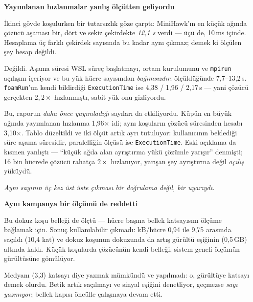 \documentclass[11pt,a4paper]{article}
\newcommand{\kkkenar}{lacivert}
\newcommand{\kkzemin}{kod}
\newenvironment{renkkutu}[3]{%
  \renewcommand{\kkkenar}{#1}\renewcommand{\kkzemin}{#2}%
  \par\medskip\noindent
  \begin{lrbox}{\kutugovde}%
  \begin{minipage}{\dimexpr\linewidth-2\fboxsep-2\fboxrule\relax}\footnotesize
  \textcolor{#1}{\textbf{#3}}\par\vspace{3pt}%
}{%
  \end{minipage}%
  \end{lrbox}%
  \noindent\fcolorbox{\kkkenar}{\kkzemin}{\usebox{\kutugovde}}%
  \par\medskip
}
\newenvironment{olculdu}[1]{\begin{renkkutu}{iyi}{iyibg}{#1}}{\end{renkkutu}}
\newenvironment{dikkat}[1]{\begin{renkkutu}{orta}{ortabg}{#1}}{\end{renkkutu}}
\begin{document}
\begin{olculdu}{Yayımlanan hızlanmalar yanlış ölçütten geliyordu}
İkinci gövde koşulurken bir tutarsızlık göze çarptı: MiniHawk'ın en küçük ağında
çözücü aşaması bir, dört ve sekiz çekirdekte \emph{12{,}1 s} verdi --- üçü de,
10\,ms içinde. Hesaplama üç farklı çekirdek sayısında bu kadar aynı çıkmaz;
demek ki ölçülen şey hesap değildi.

Değildi. Aşama süresi WSL süreç başlatmayı, ortam kurulumunu ve \texttt{mpirun}
açılışını içeriyor ve bu yük hücre sayısından \emph{bağımsızdır}: ölçüldüğünde
7{,}7--13{,}2\,s. \texttt{foamRun}'un kendi bildirdiği \texttt{ExecutionTime}
ise 4{,}38 / 1{,}96 / 2{,}17\,s --- yani çözücü gerçekten $2{,}2\times$
hızlanmıştı, sabit yük onu gizliyordu.

Bu, raporun \emph{daha önce yayımladığı} sayıları da etkiliyordu. Küpün en büyük
ağında yayımlanan hızlanma 1{,}96$\times$ idi; aynı koşuların çözücü süresinden
hesabı 3{,}10$\times$. Tablo düzeltildi ve iki ölçüt artık ayrı tutuluyor:
kullanıcının beklediği süre aşama süresidir, paralelliğin ölçüsü ise
\texttt{ExecutionTime}. Eski açıklama da kısmen yanlıştı --- ``küçük ağda alan
ayrıştırma yükü çözümle yarışır'' denmişti; 16 bin hücrede çözücü rahatça
$2\times$ hızlanıyor, yarışan şey ayrıştırma değil \emph{açılış} yüküydü.

\begin{center}\itshape
Aynı sayının üç kez üst üste çıkması bir doğrulama değil, bir uyarıydı.
\end{center}
\end{olculdu}

\begin{dikkat}{Aynı kampanya bir ölçümü de reddetti}
Bu dokuz koşu belleği de ölçtü --- hücre başına bellek katsayısını ölçüme
bağlamak için. Sonuç kullanılabilir çıkmadı: kB/hücre 0{,}94 ile 9{,}75
arasında saçıldı (10{,}4 kat) ve dokuz koşunun dokuzunda da artış gürültü
eşiğinin (0{,}5\,GB) altında kaldı. Küçük koşularda çözücünün kendi belleği,
sistem geneli ölçümün gürültüsüne gömülüyor.

Medyanı (3{,}3) katsayı diye yazmak mümkündü ve yapılmadı: o, gürültüye katsayı
demek olurdu. Betik artık saçılmayı ve sinyal eşiğini denetliyor, geçmezse
\emph{sayı yazmıyor}; bellek kapısı öncülle çalışmaya devam etti.
\end{dikkat}
\end{document}
